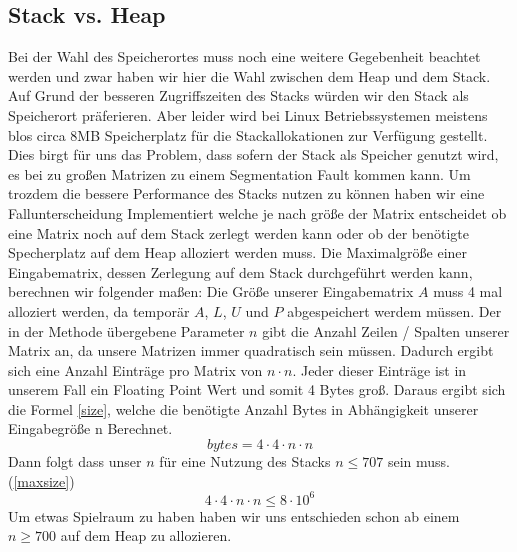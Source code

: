 \documentclass[course=erap]{aspdoc}
\begin{document}
\subsection{Stack vs. Heap}
Bei der Wahl des Speicherortes muss noch eine weitere Gegebenheit beachtet werden
und zwar haben wir hier die Wahl zwischen dem Heap und dem Stack. Auf Grund der besseren Zugriffszeiten des Stacks würden wir den Stack als Speicherort präferieren\cite{stack}.
Aber leider wird bei Linux Betriebssystemen meistens blos circa 8MB Speicherplatz für die Stackallokationen zur Verfügung gestellt.\cite{stackSize} Dies birgt für uns das Problem, dass sofern der Stack als Speicher genutzt wird,
es bei zu großen Matrizen zu einem Segmentation Fault kommen kann. Um trozdem die bessere Performance des Stacks nutzen zu können haben wir eine Fallunterscheidung Implementiert welche je nach größe der Matrix entscheidet
ob eine Matrix noch auf dem Stack zerlegt werden kann oder ob der benötigte Specherplatz auf dem Heap alloziert werden muss.
Die Maximalgröße einer Eingabematrix, dessen Zerlegung auf dem Stack durchgeführt werden kann, berechnen wir folgender maßen:
Die Größe unserer Eingabematrix $A$ muss 4 mal alloziert werden, da temporär $A$, $L$, $U$ und $P$ abgespeichert werdem müssen.
Der in der Methode übergebene Parameter $n$ gibt die Anzahl Zeilen / Spalten unserer Matrix an, da unsere Matrizen immer quadratisch sein müssen. Dadurch ergibt sich eine Anzahl Einträge pro Matrix von $n \cdot n $. 
Jeder dieser Einträge ist in unserem Fall ein Floating Point Wert und somit 4 Bytes groß.
Daraus ergibt sich die Formel \ref{size}, welche die benötigte Anzahl Bytes in Abhängigkeit unserer Eingabegröße n Berechnet.\\
  \begin{equation}
    \label{size}
    bytes = 4 \cdot 4 \cdot n \cdot n
    \end{equation}
    Dann folgt dass unser $n$ für eine Nutzung des Stacks  $n \leq 707$  sein muss.(\ref{maxsize})
    \begin{equation}
    \label{maxsize}
    4 \cdot 4 \cdot n \cdot n \leq 8 \cdot 10^6
  \end{equation}
 Um etwas Spielraum zu haben haben wir uns entschieden schon ab einem $n \geq 700$ auf dem Heap zu allozieren.\\
\end{document}
